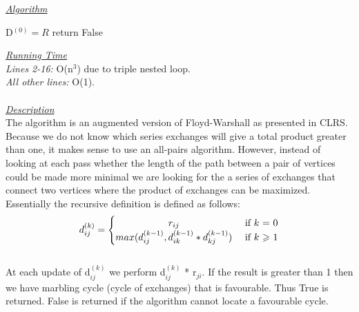 \documentclass[10pt]{csc_assignment}
\begin{document}
\begin{description}
\emph{\underline{Algorithm}}\\
\begin{algorithm}[H]
 \LinesNumbered 
 D$^{(0)} = R$\;
 return False\;
\end{algorithm}
\emph{\underline{Running Time}}\\
\emph{Lines 2-16:} O(n$^{3}$) due to triple nested loop.\\
\emph{All other lines:} O(1).\\
\\
\emph{\underline{Description}}\\
The algorithm is an augmented version of Floyd-Warshall as presented 
in CLRS. Because we do not know which series exchanges will give a 
total product greater than one, it makes sense to use an all-pairs
algorithm. However, instead of looking at each pass whether the
length of the path between a pair of vertices could be made more 
minimal we are looking for the a series of exchanges that connect
two vertices where the product of exchanges can be maximized.\\
Essentially the recursive definition is defined as follows:\\
\[
d_{ij}^{(k)} = 
\begin{cases} 
      \hfill r_{ij}    \hfill & \text{ if $k$ = 0} \\
      \hfill max(d_{ij}^{(k-1)}, d_{ik}^{(k-1)} * d_{kj}^{(k-1)})\hfill & \text{ if $k$ $\geqslant$ 1} \\
  \end{cases}
\]\\
At each update of d$_{ij}^{(k)}$ we perform d$_{ij}^{(k)}$ * r$_{ji}$. 
If the result is greater than 1 then we have marbling cycle (cycle
 of exchanges) that is favourable. Thus True is returned. 
 False is returned if the algorithm cannot locate a favourable
 cycle.\\


\end{description}
\end{document}

